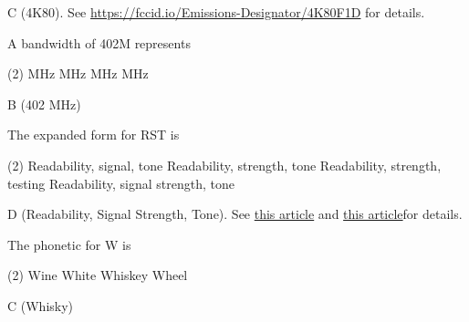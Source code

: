 \documentclass[a4paper]{article}
\begin{document}
\begin{solution}
	C (4K80). See \url{https://fccid.io/Emissions-Designator/4K80F1D} for details.
\end{solution}

\vspace{5mm}



\begin{question}A bandwidth of \apostrophe{}402M\apostrophe{} represents
	\begin{tasks}(2)
		 MHz
		 MHz
		 MHz
		 MHz
	\end{tasks}
\end{question}

\begin{solution}
	B (402 MHz)
\end{solution}

\vspace{5mm}



\begin{question}The expanded form for RST is
	\begin{tasks}(2)
		\task Readability, signal, tone
		\task Readability, strength, tone
		\task Readability, strength, testing
		\task Readability, signal strength, tone
	\end{tasks}
\end{question}

\begin{solution}
	D (Readability, Signal Strength, Tone). See \href{https://en.wikipedia.org/wiki/R-S-T_system}{this article} and \href{https://hamradioschool.com/practical-signal-reports/}{this article}for details.
\end{solution}

\vspace{5mm}



\begin{question}The phonetic for \apostrophe{}W\apostrophe{} is
	\begin{tasks}(2)
		\task Wine
		\task White
		\task Whiskey
		\task Wheel
	\end{tasks}
\end{question}

\begin{solution}
	C (Whisky)
\end{solution}

\vspace{5mm}
\end{document}
